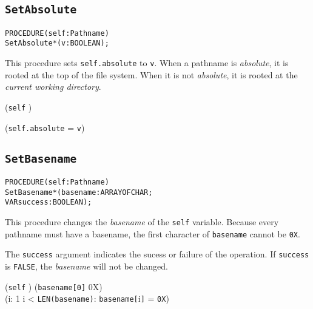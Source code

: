 \subsection{\texttt{SetAbsolute}}\label{pathnames:setAbsolute}
\begin{alltt}
  PROCEDURE (self : Pathname)
            SetAbsolute*(v : BOOLEAN);
\end{alltt}

\begin{semantics}
  This procedure sets \texttt{self.absolute} to \texttt{v}.  When a
  pathname is \emph{absolute}, it is rooted at the top of the file
  system.  When it is not \emph{absolute}, it is rooted at the
  \emph{current working directory}.
\end{semantics}

\begin{precondition}
(\texttt{self} \neq \nil) \logicaland {}
\end{precondition}

\begin{postcondition}
  (\texttt{self.absolute}  = \texttt{v})
\end{postcondition}


\subsection{\texttt{SetBasename}}\label{pathnames:setBasename}
\begin{alltt}
  PROCEDURE (self : Pathname)
            SetBasename*(basename    : ARRAY OF CHAR;
                         VAR success : BOOLEAN);
\end{alltt}

\begin{semantics}
  This procedure changes the \emph{basename} of the \texttt{self}
  variable.  Because every pathname must have a basename, the first
  character of \texttt{basename} cannot be \texttt{0X}.

  The \texttt{success} argument indicates the sucess or failure of the
  operation.  If \texttt{success} is \texttt{FALSE}, the \emph{basename}
  will not be changed.
\end{semantics}

\begin{precondition}
(\texttt{self} \neq \nil) \logicaland {} \logicaland
  (\texttt{basename[0]} \neq 0X) \logicaland \\
  (\exists i: 1 \leq i < \texttt{LEN(basename)}: \texttt{basename[}i\texttt{]} = \texttt{0X})
\end{precondition}

